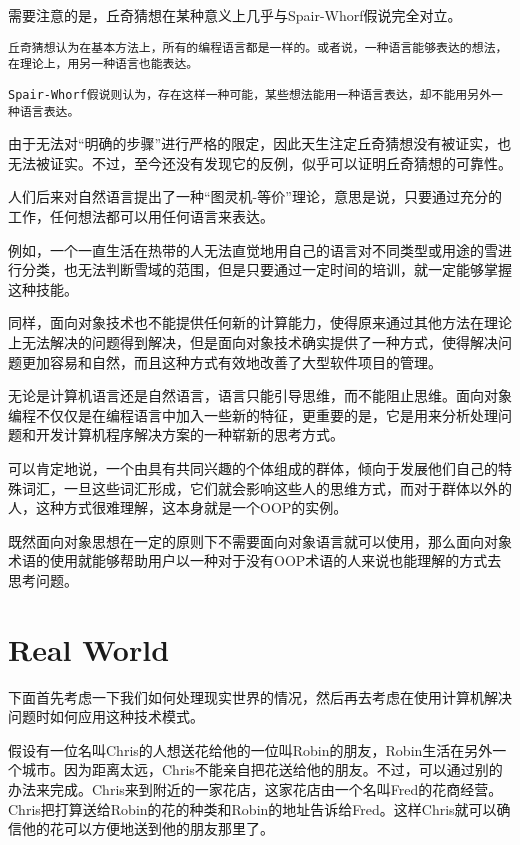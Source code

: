 需要注意的是，丘奇猜想在某种意义上几乎与Spair-Whorf假说完全对立。


\begin{compactitem}
\item \texttt{丘奇猜想认为在基本方法上，所有的编程语言都是一样的。或者说，一种语言能够表达的想法，在理论上，用另一种语言也能表达。}
\item \texttt{Spair-Whorf假说则认为，存在这样一种可能，某些想法能用一种语言表达，却不能用另外一种语言表达。}
\end{compactitem}

由于无法对“明确的步骤”进行严格的限定，因此天生注定丘奇猜想没有被证实，也无法被证实。不过，至今还没有发现它的反例，似乎可以证明丘奇猜想的可靠性。


人们后来对自然语言提出了一种“图灵机-等价”理论，意思是说，只要通过充分的工作，任何想法都可以用任何语言来表达。

例如，一个一直生活在热带的人无法直觉地用自己的语言对不同类型或用途的雪进行分类，也无法判断雪域的范围，但是只要通过一定时间的培训，就一定能够掌握这种技能。

同样，面向对象技术也不能提供任何新的计算能力，使得原来通过其他方法在理论上无法解决的问题得到解决，但是面向对象技术确实提供了一种方式，使得解决问题更加容易和自然，而且这种方式有效地改善了大型软件项目的管理。


无论是计算机语言还是自然语言，语言只能引导思维，而不能阻止思维。面向对象编程不仅仅是在编程语言中加入一些新的特征，更重要的是，它是用来分析处理问题和开发计算机程序解决方案的一种崭新的思考方式。

可以肯定地说，一个由具有共同兴趣的个体组成的群体，倾向于发展他们自己的特殊词汇，一旦这些词汇形成，它们就会影响这些人的思维方式，而对于群体以外的人，这种方式很难理解，这本身就是一个OOP的实例。

既然面向对象思想在一定的原则下不需要面向对象语言就可以使用，那么面向对象术语的使用就能够帮助用户以一种对于没有OOP术语的人来说也能理解的方式去思考问题。


\chapter{Real World}

下面首先考虑一下我们如何处理现实世界的情况，然后再去考虑在使用计算机解决问题时如何应用这种技术模式。

假设有一位名叫Chris的人想送花给他的一位叫Robin的朋友，Robin生活在另外一个城市。因为距离太远，Chris不能亲自把花送给他的朋友。不过，可以通过别的办法来完成。Chris来到附近的一家花店，这家花店由一个名叫Fred的花商经营。Chris把打算送给Robin的花的种类和Robin的地址告诉给Fred。这样Chris就可以确信他的花可以方便地送到他的朋友那里了。


